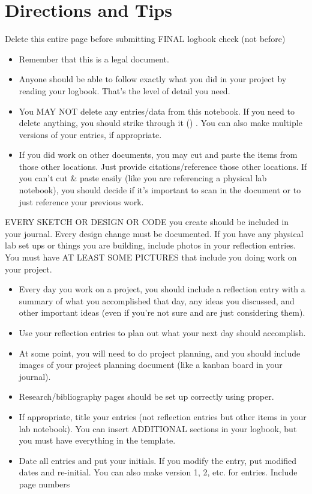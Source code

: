 \part{Directions and Tips}

Delete this entire page before submitting FINAL logbook check (not before)

\begin{itemize}
\item Remember that this is a legal document.
\item Anyone should be able to follow exactly what you did in your project by
    reading your logbook. That's the level of detail you need.
\item You MAY NOT delete any entries/data from this notebook. If you need to
    delete anything, you should strike through it ()
    . You can also make multiple versions of your entries, if appropriate.
\item If you did work on other documents, you may cut and paste the items from
    those other locations. Just provide citations/reference those other
    locations. If you can't cut \& paste easily (like you are referencing a
    physical lab notebook), you should decide if it's important to scan in the
    document or to just reference your previous work.
\end{itemize}

EVERY SKETCH OR DESIGN OR CODE you create should be included in your journal.
Every design change must be documented. If you have any physical lab set ups or
things you are building, include photos in your reflection entries. You must
have AT LEAST SOME PICTURES that include you doing work on your project.

\begin{itemize}
    \item Every day you work on a project, you should include a reflection entry
        with a summary of what you accomplished that day, any ideas you
        discussed, and other important ideas (even if you're not sure and are
        just considering them).
    \item Use your reflection entries to plan out what your next day should
        accomplish.
    \item At some point, you will need to do project planning, and you should
        include images of your project planning document (like a kanban board in
        your journal).
    \item Research/bibliography pages should be set up correctly using proper.
    \item If appropriate, title your entries (not reflection entries but other
        items in your lab notebook). You can insert ADDITIONAL sections in your
        logbook, but you must have everything in the template.
    \item Date all entries and put your initials. If you modify the entry, put
        modified dates and re-initial. You can also make version 1, 2, etc. for
        entries.
Include page numbers
\end{itemize}
